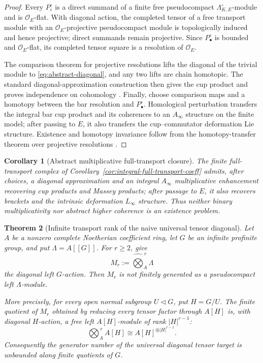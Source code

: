 \documentclass[11pt]{article}
\newtheorem{theorem}{Theorem}[section]
\newtheorem{corollary}[theorem]{Corollary}
\theoremstyle{definition}
\begin{document}
\begin{proof}
Every $P_i^{\circ}$ is a direct summand of a finite free pseudocompact $\Lambda_{K,E}^{\circ}$-module and is $\mathcal O_E$-flat.  With diagonal action, the completed tensor of a free transport module with an $\mathcal O_E$-projective pseudocompact module is topologically induced and hence projective; direct summands remain projective.  Since $P_\bullet^{\circ}$ is bounded and $\mathcal O_E$-flat, its completed tensor square is a resolution of $\mathcal O_E$.

The comparison theorem for projective resolutions lifts the diagonal of the trivial module to \eqref{eq:abstract-diagonal}, and any two lifts are chain homotopic.  The standard diagonal-approximation construction then gives the cup product and proves independence on cohomology \cite{BrownCohomology}.  Finally, choose comparison maps and a homotopy between the bar resolution and $P_\bullet^{\circ}$.  Homological perturbation transfers the integral bar cup product and its coherences to an $A_\infty$ structure on the finite model; after passing to $E$, it also transfers the cup--commutator deformation Lie structure.  Existence and homotopy invariance follow from the homotopy-transfer theorem over projective resolutions \cite{ManettiPerturbation,BurkeTransfer,VokrinekHPT}.
\end{proof}

\begin{corollary}[Abstract multiplicative full-transport closure]\label{cor:abstract-multiplicative-closure}
The finite full-transport complex of Corollary~\ref{cor:integral-full-transport-coeff} admits, after choices, a diagonal approximation and an integral $A_\infty$ multiplicative enhancement recovering cup products and Massey products; after passage to $E$, it also recovers brackets and the intrinsic deformation $L_\infty$ structure.  Thus neither binary multiplicativity nor abstract higher coherence is an existence problem.
\end{corollary}

\begin{theorem}[Infinite transport rank of the naive universal tensor diagonal]\label{thm:infinite-diagonal-transport-rank}
Let $A$ be a nonzero complete Noetherian coefficient ring, let $G$ be an
infinite profinite group, and put $\Lambda=A[[G]]$.  For $r\ge2$, give
\[
M_r:=\widehat{\bigotimes}_{A}^{\,r}\Lambda
\]
the diagonal left $G$-action.  Then $M_r$ is not finitely generated as a
pseudocompact left $\Lambda$-module.

More precisely, for every open normal subgroup $U\triangleleft G$, put
$H=G/U$.  The finite quotient of $M_r$ obtained by reducing every tensor
factor through $A[H]$ is, with diagonal $H$-action, a free left $A[H]$-module
of rank $|H|^{r-1}$:
\begin{equation}\label{eq:finite-quotient-diagonal-rank}
\bigotimes_A^{\,r}A[H]
\cong
A[H]^{\oplus |H|^{r-1}}.
\end{equation}
Consequently the generator number of the universal diagonal tensor target is
unbounded along finite quotients of $G$.
\end{theorem}
\end{document}

